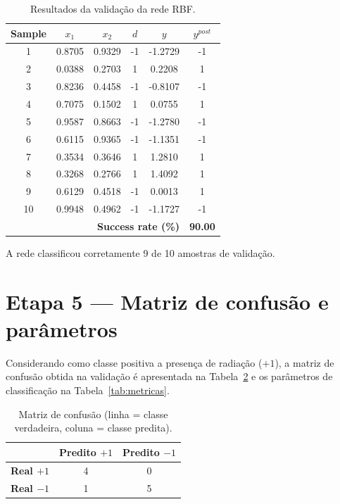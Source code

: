 \documentclass[12pt,a4paper]{article}
\begin{document}
\begin{table}[H]
\centering
\caption{Resultados da validação da rede RBF.}
\label{tab:validacao}
\begin{tabular}{cccccc}
\toprule
\textbf{Sample} & $x_1$ & $x_2$ & $d$ & $y$ & $y^{post}$ \\
\midrule
1 & 0.8705 & 0.9329 & -1 & -1.2729 & -1 \\
2 & 0.0388 & 0.2703 & 1 & 0.2208 & 1 \\
3 & 0.8236 & 0.4458 & -1 & -0.8107 & -1 \\
4 & 0.7075 & 0.1502 & 1 & 0.0755 & 1 \\
5 & 0.9587 & 0.8663 & -1 & -1.2780 & -1 \\
6 & 0.6115 & 0.9365 & -1 & -1.1351 & -1 \\
7 & 0.3534 & 0.3646 & 1 & 1.2810 & 1 \\
8 & 0.3268 & 0.2766 & 1 & 1.4092 & 1 \\
9 & 0.6129 & 0.4518 & -1 & 0.0013 & 1 \\
10 & 0.9948 & 0.4962 & -1 & -1.1727 & -1 \\
\midrule
\multicolumn{5}{r}{\textbf{Success rate (\%)}} & \textbf{90.00} \\
\bottomrule
\end{tabular}
\end{table}
A rede classificou corretamente 9 de 10 amostras de validação.

\section*{Etapa 5 --- Matriz de confusão e parâmetros}
Considerando como classe positiva a presença de radiação ($+1$), a matriz de confusão
obtida na validação é apresentada na Tabela~\ref{tab:confusao} e os parâmetros de
classificação na Tabela~\ref{tab:metricas}.

\begin{table}[H]
\centering
\caption{Matriz de confusão (linha = classe verdadeira, coluna = classe predita).}
\label{tab:confusao}
\begin{tabular}{ccc}
\toprule
 & \textbf{Predito $+1$} & \textbf{Predito $-1$} \\
\midrule
\textbf{Real $+1$} & 4 & 0 \\
\textbf{Real $-1$} & 1 & 5 \\
\bottomrule
\end{tabular}
\end{table}
\end{document}
